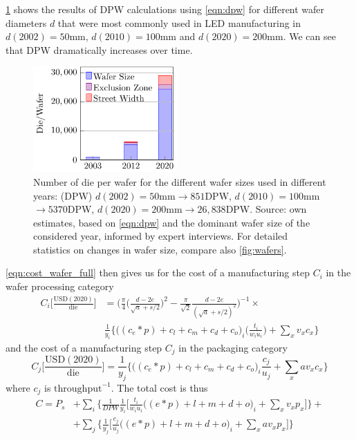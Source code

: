 \documentclass[parskip=full]{article}
\begin{document}
\cref{fig:dpw} shows the results of DPW calculations using \cref{eqn:dpw} for different wafer diameters $d$ that were most commonly used in LED manufacturing in $d(2002)=50$mm, $d(2010)=100$mm and $d(2020)=200$mm. We can see that DPW dramatically increases over time.

\begin{figure}[h!]
    \centering
    \includegraphics[width=5.5cm]{./figures/die-per-wafer.pdf}
    \caption{Number of die per wafer for the different wafer sizes used in different years: (DPW) $d(2002)=50$mm$\rightarrow851$DPW, $d(2010)=100$mm$\rightarrow5370$DPW, $d(2020)=200$mm$ \rightarrow26,838$DPW. Source: own estimates, based on \cref{eqn:dpw} and the dominant wafer size of the considered year, informed by expert interviews. For detailed statistics on changes in wafer size, compare also \cref{fig:wafers}.}
    \label{fig:dpw}
\end{figure}

\cref{eqn:cost_wafer_full} then gives us for the cost of a manufacturing step $C_i$ in the wafer processing category
%
\begin{equation}
\label{eqn:cost_wafer_full}
\begin{split}
    C_i \bigg[ \frac{ \text{USD}(2020) }{ \text{die} } \bigg] &= \bigg (  \frac{\pi}{4}  \bigg ( \frac{d-2e}{\sqrt{a}+s/2} \bigg ) ^2 - \frac{\pi}{\sqrt{2}}\frac{d-2e}{(\sqrt{a}+s/2)^2} \bigg )^{-1} \times \\
    &  \frac{1}{y_i}  \bigg\{ \bigg((c_e*p) + c_l + c_m + c_d + c_o \bigg)_i \bigg( \frac{t_i}{w_i u_i} \bigg) + \sum_{x} v_x c_x \bigg\}
\end{split}
\end{equation}
%
and the cost of a manufacturing step $C_j$ in the packaging category
%
\begin{equation}
\label{eqn:cost_die}
    C_j \bigg[ \frac{ \text{USD}(2020) }{ \text{die} } \bigg] = \frac{1}{y_j}  \bigg\{ \bigg((c_e*p) + c_l + c_m + c_d + c_o \bigg)_i  \frac{c_j}{u_j} + \sum_{x} a v_x c_x \bigg\}
\end{equation}
where $c_j$ is $\text{throughput}^{-1}$. The total cost is thus
%
\begin{equation}
\label{eqn:cost_total}
\begin{split}
    C= P_s &+ \sum_i \bigg \{ \frac{1}{DPW} \frac{1}{y_i} \bigg[ \frac{t_i}{w_i u_i} \bigg((e*p) + l + m + d +o \bigg)_i  + \sum_{x} v_x p_x \bigg] \bigg \} + \\
    & + \sum_j \bigg \{ \frac{1}{y_j} \bigg[ \frac{c_j}{u_j}  \bigg((e*p) + l + m + d + o \bigg)_i + \sum_{x} a v_x p_x \bigg ] \bigg\}
\end{split}
\end{equation}
\end{document}
